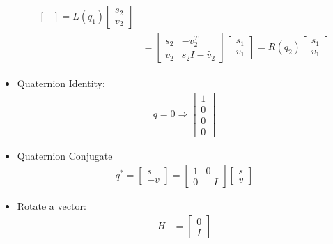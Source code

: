 \begin{itemize}
\begin{align}
\begin{split}
\begin{bmatrix}
            \end{bmatrix} 
            = L(q_1)
            \begin{bmatrix}
                s_2 \\ v_2
            \end{bmatrix} \\
            & = \begin{bmatrix}
                s_2 & -v_2^T \\
                v_2 & s_2I - \hat v_2
            \end{bmatrix}
            \begin{bmatrix}
                s_1 \\ v_1
            \end{bmatrix} 
            = R(q_2)
            \begin{bmatrix}
                s_1 \\ v_1
            \end{bmatrix} 
        \end{split}
    \end{align}
    \item Quaternion Identity:
    \begin{align}
        q = 0 \Rightarrow
        \begin{bmatrix}
            1 \\ 0 \\ 0 \\ 0
        \end{bmatrix}
    \end{align}
    \item Quaternion Conjugate
    \begin{align}
        q^* = \begin{bmatrix}
            s \\ -v
        \end{bmatrix} =
        \begin{bmatrix}
            1 & 0 \\
            0 & -I
        \end{bmatrix}
        \begin{bmatrix}
            s \\ v
        \end{bmatrix}
    \end{align}
    \item Rotate a vector:
    \begin{align}
        H & = \begin{bmatrix}
            0 \\ I

\end{bmatrix}
\end{align}
\end{itemize}
